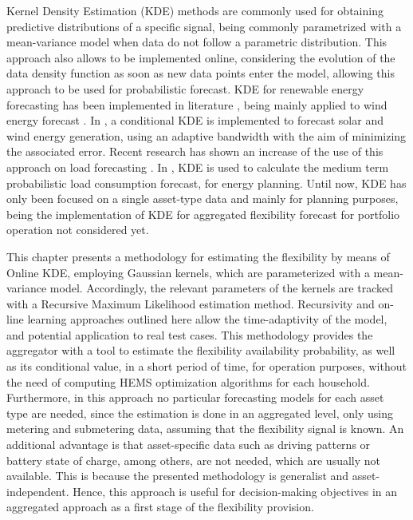 Kernel Density Estimation (KDE) methods are commonly used for obtaining predictive distributions of a specific signal, being commonly parametrized with a mean-variance model when data do not follow a parametric distribution. This approach also allows to be implemented online, considering the evolution of the data density function as soon as new data points enter the model, allowing this approach to be used for probabilistic forecast. KDE for renewable energy forecasting has been implemented in literature \cite{Shi2020}, being mainly applied to wind energy forecast \cite{Pinson2009}. In \cite{Shi2020}, a conditional KDE is implemented to forecast solar and wind energy generation, using an adaptive bandwidth with the aim of minimizing the associated error. Recent research has shown an increase of the use of this approach on load forecasting \cite{Wang2019, Haben2016}. In \cite{Wang2019}, KDE is used to calculate the medium term probabilistic load consumption forecast, for energy planning. Until now, KDE has only been focused on a single asset-type data and mainly for planning purposes, being the implementation of KDE for aggregated flexibility forecast for portfolio operation not considered yet.

This chapter presents a methodology for estimating the flexibility by means of Online KDE, employing Gaussian kernels, which are parameterized with a mean-variance model. Accordingly, the relevant parameters of the kernels are tracked with a Recursive Maximum Likelihood estimation method. Recursivity and on-line learning approaches outlined here allow the time-adaptivity of the model, and potential application to real test cases. This methodology provides the aggregator with a tool to estimate the flexibility availability probability, as well as its conditional value, in a short period of time, for operation purposes, without the need of computing HEMS optimization algorithms for each household. Furthermore, in this approach no particular forecasting models for each asset type are needed, since the estimation is done in an aggregated level, only using metering and submetering data, assuming that the flexibility signal is known. An additional advantage is that asset-specific data such as driving patterns or battery state of charge, among others, are not needed, which are usually not available. This is because the presented methodology is generalist and asset-independent. Hence, this approach is useful for decision-making objectives in an aggregated approach as a first stage of the flexibility provision.


